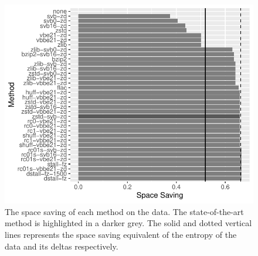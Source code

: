\begin{figure}
\centering
%
\includegraphics[scale=0.9]{plots/reads.blow5.test.ss.bar.pdf}
	\caption[The space saving of each method on the
	data.]{\label{fig:results-ss}The space saving of each method on the
	data. The state-of-the-art method is highlighted in a darker grey.
	The solid and dotted vertical lines represents the space saving
	equivalent of the entropy of the data and its deltas respectively.}
\end{figure}

